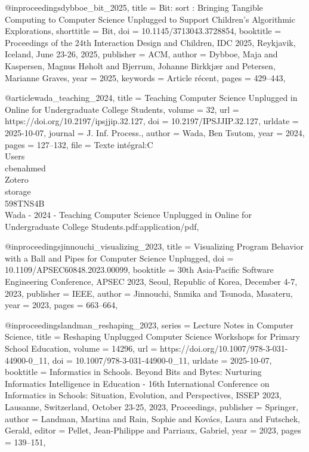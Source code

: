 @inproceedings{dybboe_bit_2025,
	title = {Bit: sort : {Bringing} {Tangible} {Computing} to {Computer} {Science} {Unplugged} to {Support} {Children}'s 
{Algorithmic} {Explorations}},
	shorttitle = {Bit},
	doi = {10.1145/3713043.3728854},
	booktitle = {Proceedings of the 24th {Interaction} {Design} and {Children}, {IDC} 2025, {Reykjavik}, {Iceland}, {June} 
23-26, 2025},
	publisher = {ACM},
	author = {Dybboe, Maja and Kaspersen, Magnus Høholt and Bjerrum, Johanne Birkkjær and Petersen, Marianne Graves},
	year = {2025},
	keywords = {Article récent},
	pages = {429--443},
}

@article{wada_teaching_2024,
	title = {Teaching {Computer} {Science} {Unplugged} in {Online} for {Undergraduate} {College} {Students}},
	volume = {32},
	url = {https://doi.org/10.2197/ipsjjip.32.127},
	doi = {10.2197/IPSJJIP.32.127},
	urldate = {2025-10-07},
	journal = {J. Inf. Process.},
	author = {Wada, Ben Tsutom},
	year = {2024},
	pages = {127--132},
	file = {Texte intégral:C\:\\Users\\cbenahmed\\Zotero\\storage\\598TNS4B\\Wada - 2024 - Teaching Computer Science 
Unplugged in Online for Undergraduate College Students.pdf:application/pdf},
}

@inproceedings{jinnouchi_visualizing_2023,
	title = {Visualizing {Program} {Behavior} with a {Ball} and {Pipes} for {Computer} {Science} {Unplugged}},
	doi = {10.1109/APSEC60848.2023.00099},
	booktitle = {30th {Asia}-{Pacific} {Software} {Engineering} {Conference}, {APSEC} 2023, {Seoul}, {Republic} of {Korea}, 
{December} 4-7, 2023},
	publisher = {IEEE},
	author = {Jinnouchi, Snmika and Tsunoda, Masateru},
	year = {2023},
	pages = {663--664},
}

@inproceedings{landman_reshaping_2023,
	series = {Lecture {Notes} in {Computer} {Science}},
	title = {Reshaping {Unplugged} {Computer} {Science} {Workshops} for {Primary} {School} {Education}},
	volume = {14296},
	url = {https://doi.org/10.1007/978-3-031-44900-0\_11},
	doi = {10.1007/978-3-031-44900-0_11},
	urldate = {2025-10-07},
	booktitle = {Informatics in {Schools}. {Beyond} {Bits} and {Bytes}: {Nurturing} {Informatics} {Intelligence} in 
{Education} - 16th {International} {Conference} on {Informatics} in {Schools}: {Situation}, {Evolution}, and {Perspectives}, 
{ISSEP} 2023, {Lausanne}, {Switzerland}, {October} 23-25, 2023, {Proceedings}},
	publisher = {Springer},
	author = {Landman, Martina and Rain, Sophie and Kovács, Laura and Futschek, Gerald},
	editor = {Pellet, Jean-Philippe and Parriaux, Gabriel},
	year = {2023},
	pages = {139--151},
}

